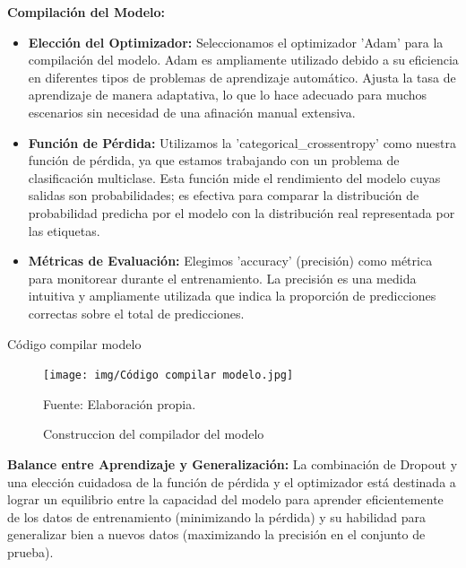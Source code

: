 \textbf{Compilación del Modelo:} 
\begin{itemize}
    \item \textbf{Elección del Optimizador:} Seleccionamos el optimizador 'Adam' para la compilación del modelo. Adam es ampliamente utilizado debido a su eficiencia en diferentes tipos de problemas de aprendizaje automático. Ajusta la tasa de aprendizaje de manera adaptativa, lo que lo hace adecuado para muchos escenarios sin necesidad de una afinación manual extensiva.
    \item \textbf{Función de Pérdida:} Utilizamos la 'categorical\_crossentropy' como nuestra función de pérdida, ya que estamos trabajando con un problema de clasificación multiclase. Esta función mide el rendimiento del modelo cuyas salidas son probabilidades; es efectiva para comparar la distribución de probabilidad predicha por el modelo con la distribución real representada por las etiquetas.
    \item \textbf{Métricas de Evaluación:} Elegimos 'accuracy' (precisión) como métrica para monitorear durante el entrenamiento. La precisión es una medida intuitiva y ampliamente utilizada que indica la proporción de predicciones correctas sobre el total de predicciones.
\end{itemize}

Código compilar modelo

\begin{figure}[H]
    \begin{minipage}[t]{0.9\textwidth}
        \caption{Construccion del compilador del modelo}
        \label{compilar_modelo}        
    \end{minipage}

    \vspace{10pt}

    \begin{minipage}[b]{1\textwidth}
        \centering
        \texttt{[image: img/Código compilar modelo.jpg]}        
    \end{minipage}

    \begin{minipage}[t]{0.9\textwidth}
        Fuente: Elaboración propia.
    \end{minipage}
\end{figure}

\textbf{Balance entre Aprendizaje y Generalización:} La combinación de Dropout y una elección cuidadosa de la función de pérdida y el optimizador está destinada a lograr un equilibrio entre la capacidad del modelo para aprender eficientemente de los datos de entrenamiento (minimizando la pérdida) y su habilidad para generalizar bien a nuevos datos (maximizando la precisión en el conjunto de prueba).

